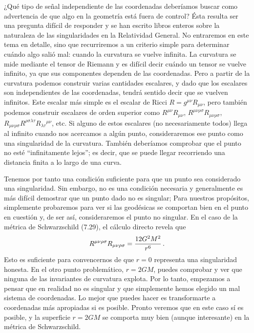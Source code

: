 \documentclass[11pt,b5paper,openany,twoside]{book}
\newcommand{\mn}{{\mu\nu}}
\begin{document}
¿Qué tipo de señal independiente de las coordenadas deberíamos buscar como advertencia de que algo en la geometría está fuera de control? Ésta resulta ser una pregunta difícil de responder y se han escrito libros enteros sobre la naturaleza de las singularidades en la Relatividad General.
No entraremos en este tema en detalle, sino que recurriremos a un criterio simple para determinar cuándo algo salió mal: cuando la curvatura se vuelve infinita.
La curvatura se mide mediante el tensor de Riemann y es difícil decir cuándo un tensor se vuelve infinito, ya que sus componentes dependen de las coordenadas.
Pero a partir de la curvatura podemos construir varias cantidades escalares, y dado que los escalares son independientes de las coordenadas, tendrá sentido decir que se vuelven infinitos.
Este escalar más simple es el escalar de Ricci $R=g^\mn R_\mn$, pero también podemos construir escalares de orden superior como $R^\mn R_\mn$, $R^{\mn\rho\sigma}R_{\mn\rho\sigma}$, $R_{\mn\rho\sigma} R^{\rho\sigma\lambda\tau} R_{\lambda\tau}{}^{\mn}$, etc.
Si alguno de estos escalares (no necesariamente todos) llega al infinito cuando nos acercamos a algún punto, consideraremos ese punto como una singularidad de la curvatura.
También deberíamos comprobar que el punto no esté ``infinitamente lejos''; es decir, que se puede llegar recorriendo una distancia finita a lo largo de una curva.

Tenemos por tanto una condición suficiente para que un punto sea considerado una singularidad.
Sin embargo, no es una condición necesaria y generalmente es más difícil demostrar que un punto dado no es singular; Para nuestros propósitos, simplemente probaremos para ver si las geodésicas se comportan bien en el punto en cuestión y, de ser así, consideraremos el punto no singular.
En el caso de la métrica de Schwarzschild (7.29), el cálculo directo revela que
\begin{equation}
R^{\mn\rho\sigma}R_{\mn\rho\sigma} = {{12 G^2 M^2}\over {r^6}}\,.
\label{7.30}
\end{equation}
Esto es suficiente para convencernos de que $r=0$ representa una singularidad honesta.
En el otro punto problemático, $r=2GM$, puedes comprobar y ver que ninguna de las invariantes de curvatura explota.
Por lo tanto, empezamos a pensar que en realidad no es singular y que simplemente hemos elegido un mal sistema de coordenadas.
Lo mejor que puedes hacer es transformarte a coordenadas más apropiadas si es posible.
Pronto veremos que en este caso sí es posible, y la superficie $r=2GM$ se comporta muy bien (aunque interesante) en la métrica de Schwarzschild.
\end{document}
